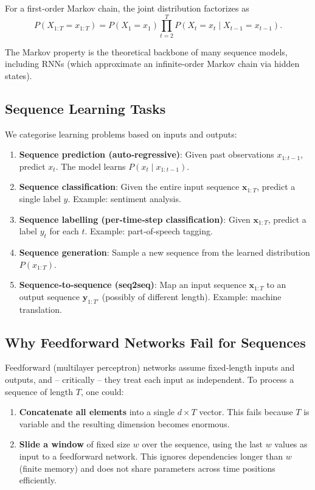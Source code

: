 \documentclass{tufte-handout}
\begin{document}
\begin{thm}
    For a first‑order Markov chain, the joint distribution factorizes as
    \[
    P(X_{1:T} = x_{1:T}) = P(X_1 = x_1) \prod_{t=2}^{T} P(X_t = x_t \mid X_{t-1} = x_{t-1}).
    \]
\end{thm}

The Markov property is the theoretical backbone of many sequence models, including RNNs (which approximate an infinite‑order Markov chain via hidden states).

\subsection{Sequence Learning Tasks}

We categorise learning problems based on inputs and outputs:

\begin{enumerate}
    \item \textbf{Sequence prediction (auto‑regressive)}: Given past observations $x_{1:t-1}$, predict $x_t$. The model learns $P(x_t \mid x_{1:t-1})$.
    \item \textbf{Sequence classification}: Given the entire input sequence $\mathbf{x}_{1:T}$, predict a single label $y$. Example: sentiment analysis.
    \item \textbf{Sequence labelling (per‑time‑step classification)}: Given $\mathbf{x}_{1:T}$, predict a label $y_t$ for each $t$. Example: part‑of‑speech tagging.
    \item \textbf{Sequence generation}: Sample a new sequence from the learned distribution $P(x_{1:T})$.
    \item \textbf{Sequence‑to‑sequence (seq2seq)}: Map an input sequence $\mathbf{x}_{1:T}$ to an output sequence $\mathbf{y}_{1:T'}$ (possibly of different length). Example: machine translation.
\end{enumerate}

\subsection{Why Feedforward Networks Fail for Sequences}

Feedforward (multilayer perceptron) networks assume fixed‑length inputs and outputs, and – critically – they treat each input as independent. To process a sequence of length $T$, one could:
\begin{enumerate}
    \item \textbf{Concatenate all elements} into a single $d \times T$ vector. This fails because $T$ is variable and the resulting dimension becomes enormous.
    \item \textbf{Slide a window} of fixed size $w$ over the sequence, using the last $w$ values as input to a feedforward network. This ignores dependencies longer than $w$ (finite memory) and does not share parameters across time positions efficiently.
\end{enumerate}
\end{document}
